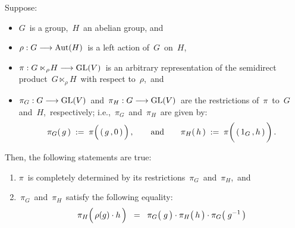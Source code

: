 
\vskip 0.5cm
\begin{proposition}
\mbox{}
\vskip 0.1cm
\noindent
Suppose:
\begin{itemize}
\item
	$G$\, is a group, \,$H$\, an {\color{red}abelian} group, and
\item
	$\rho : G \longrightarrow \textnormal{Aut}(H)$\,
	is a left action of \,$G$\, on \,$H$,\,
\item
	$\pi : G \ltimes_{\rho}\! H \longrightarrow \textnormal{GL}(V)$\,
	is an arbitrary representation of the semidirect product
	\,$G \ltimes_{\rho}\! H$\, with respect to \,$\rho$,\, and
\item
	$\pi_{G} : G \longrightarrow \textnormal{GL}(V)$\, and \,$\pi_{H} : G \longrightarrow \textnormal{GL}(V)$\,
	are the restrictions of \,$\pi$\, to \,$G$\, and \,$H$,\, respectively; i.e.,
	\,$\pi_{G}$\, and \,$\pi_{H}$\,
	are given by:
	\begin{equation*}
	\pi_{G}(\,g\,) \; := \; \pi\!\left(\,(\,\overset{{\color{white}1}}{g}\,,0\,)\,\right),
	\quad\quad
	\textnormal{and}
	\quad\quad
	\pi_{H}(\,h\,) \; := \; \pi\!\left(\,(\,1_{G}\,,\overset{{\color{white}1}}{h}\,)\,\right).
	\end{equation*}
\end{itemize}
Then, the following statements are true:
\begin{enumerate}
\item
	$\pi$\, is completely determined by its restrictions \,$\pi_{G}$\, and \,$\pi_{H}$,\, and
\item
	\,$\pi_{G}$\, and \,$\pi_{H}$\, satisfy the following equality:
	\begin{equation*}
	\pi_{H}\!\left(\,\rho(g) \cdot \overset{{\color{white}.}}{h}\,\right)
	\;\; = \;\;
		\pi_{G}\!\left(\; \overset{{\color{white}.}}{g} \,\right)
		\cdot
		\pi_{H}\!\left(\overset{{\color{white}.}}{{\color{white}g}}\!\! h \,\right)
		\cdot
		\pi_{G}\!\left(\; g^{-1} \,\right)
	\end{equation*}
\end{enumerate}
\end{proposition}
\proof
